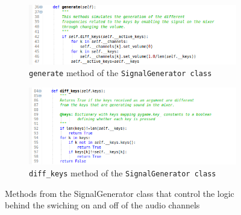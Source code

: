 \documentclass[margin,line,a4paper,authoryear,12pt]{report}
\begin{document}
 
\begin{center}
    \begin{figure}[h!]
        \begin{subfigure}{0.8\linewidth}
            \centering
            \includegraphics[width=\linewidth]{SignalGenerator_generate.png}
            \caption{\texttt{generate} method of the \texttt{SignalGenerator class}}
            \label{fig:generate}
        \end{subfigure}
        \begin{subfigure}{0.8\linewidth}
            \centering
            \includegraphics[width=\linewidth]{SignalGenerator_diff_keys.png}
            \caption{\texttt{diff\_keys} method of the \texttt{SignalGenerator class}}
            \label{fig:diffkeys}
        \end{subfigure}
        
        \caption{Methods from the SignalGenerator class that control the logic behind the swiching on and off of the audio channels}
    \end{figure}
\end{center}
\end{document}
